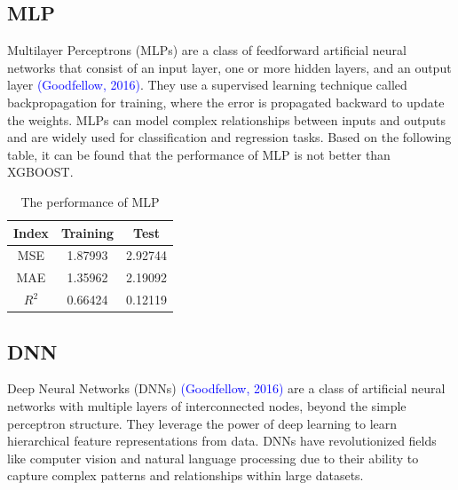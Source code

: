 \documentclass[sn-mathphys-num]{sn-jnl}%
\theoremstyle{thmstyleone}%
\theoremstyle{thmstyletwo}%
\theoremstyle{thmstylethree}%
\begin{document}
\subsection{MLP}

Multilayer Perceptrons (MLPs) are a class of feedforward artificial neural networks that consist of an input layer, one or more hidden layers, and an output layer \textcolor{blue}{(Goodfellow, 2016)}. They use a supervised learning technique called backpropagation for training, where the error is propagated backward to update the weights. MLPs can model complex relationships between inputs and outputs and are widely used for classification and regression tasks. Based on the following table, it can be found that the performance of MLP is not better than XGBOOST.

\begin{table}[h]
  \centering
  \caption{The performance of MLP}
  \begin{tabular}{c|c|c}
  \hline
   Index  &  Training  & Test\\
   \hline
   MSE  &  1.87993  & 2.92744\\
   \hline
   MAE  & 1.35962  & 2.19092\\
   \hline
   $R^2$  &  0.66424  & 0.12119 \\
   \hline
  \end{tabular}
\end{table}



\subsection{DNN}


Deep Neural Networks (DNNs) \textcolor{blue}{(Goodfellow, 2016)} are a class of artificial neural networks with multiple layers of interconnected nodes, beyond the simple perceptron structure. They leverage the power of deep learning to learn hierarchical feature representations from data. DNNs have revolutionized fields like computer vision and natural language processing due to their ability to capture complex patterns and relationships within large datasets.
\end{document}

